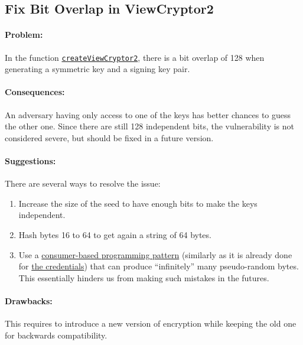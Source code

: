 \subsection{Fix Bit Overlap in ViewCryptor2}

\paragraph{Problem:}

In the function \href{https://github.com/xwiki-labs/chainpad-crypto/blob/c8b76b895f67719a3b799daac3d832fdfea45613/crypto.js#L206-L214}{\texttt{createViewCryptor2}}, there is a bit overlap of 128 when generating a symmetric key and a signing key pair.

\paragraph{Consequences:}
An adversary having only access to one of the keys has better chances to guess the other one.
Since there are still 128 independent bits, the vulnerability is not considered severe, but should be fixed in a future version.

\paragraph{Suggestions:}
There are several ways to resolve the issue:
\begin{enumerate}
  \item Increase the size of the seed to have enough bits to make the keys independent.
  \item Hash bytes 16 to 64 to get again a string of 64 bytes.
  \item Use a \href{https://git.xwikisas.com/xwiki-labs/blueprints/-/blob/8ade62e6245dd6d39106ac91376886bafa9ca9c5/prng.js}{consumer-based programming pattern} (similarly as it is already done for \href{https://github.com/xwiki-labs/cryptpad/blob/ce56447031c7644d87d802d5f5b22afbc7b7b923/www/common/common-credential.js#L50-L86}{the credentials}) that can produce \enquote{infinitely} many pseudo-random bytes.
    This essentially hinders us from making such mistakes in the futures.
\end{enumerate}

\paragraph{Drawbacks:}
This requires to introduce a new version of encryption while keeping the old one for backwards compatibility.
